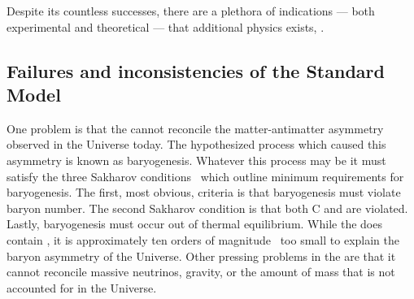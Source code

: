 Despite its countless successes, there are a plethora of indications --- both
experimental and theoretical --- that additional physics exists, \bsm.



\subsection{Failures and inconsistencies of the Standard Model}
\label{sec:bsm:fail}
One problem is that the \sm cannot reconcile the matter-antimatter asymmetry observed in the
Universe today.
The hypothesized process which caused this asymmetry is known as baryogenesis.
Whatever this process may be it must satisfy the three Sakharov
conditions~\cite{1991SvPhU..34..392S} which outline minimum requirements for baryogenesis.
The first, most obvious, criteria is that baryogenesis must violate baryon number.
The second Sakharov condition is that both \gls{C} and \CP are violated.
Lastly, baryogenesis must occur out of thermal equilibrium.
While the \sm does contain \CPV, it is approximately ten orders of
magnitude~\cite{Cline:2006ts,Huet:1994jb} too small to explain the baryon asymmetry of the
Universe.
Other pressing problems in the \sm are that it cannot reconcile massive neutrinos, gravity, or the
amount of mass that is not accounted for in the Universe.


